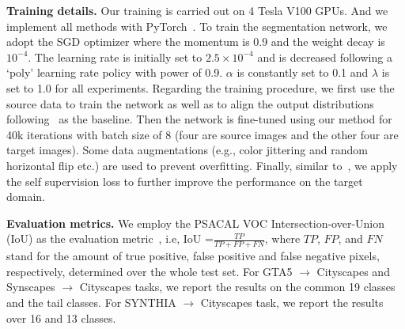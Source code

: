 \documentclass[runningheads]{llncs}
\begin{document}
\textbf{Training details.} Our training is carried out on 4 Tesla V100 GPUs. And we implement all methods with PyTorch~\cite{paszke2019pytorch}. To train the segmentation network, we adopt the SGD optimizer where the momentum is 0.9 and the weight decay is $10^{-4}$. The learning rate is initially set to $2.5\times 10^{-4}$ and is decreased following a `poly' learning rate policy with power of 0.9. $\alpha$ is constantly set to 0.1 and $\lambda$ is set to 1.0 for all experiments. 
Regarding the training procedure, we first use the source data to train the network as well as to align the output distributions following~\cite{tsai2018learning} as the baseline. Then the network is fine-tuned using our method for 40k iterations with batch size of 8 (four are source images and the other four are target images). Some data augmentations (e.g., color jittering and random horizontal flip etc.) are used to prevent overfitting. Finally, similar to~\cite{li2019bidirectional,pan2020unsupervised,wang2020class,wang2020differential}, we apply the self supervision loss to further improve the performance on the target domain. 

\textbf{Evaluation metrics.} We employ the PSACAL VOC Intersection-over-Union (IoU) as the evaluation metric~\cite{everingham2015IoU}, i.e, IoU =$\frac{TP}{TP+FP+FN}$, where $TP$, $FP$, and $FN$ stand for the amount of true positive, false positive and false negative pixels, respectively, determined over the whole test set. For GTA5 $\rightarrow$ Cityscapes and Synscapes $\rightarrow$ Cityscapes tasks, we report the results on the common 19 classes and the tail classes. For SYNTHIA $\rightarrow$ Cityscapes task, we report the results over 16 and 13 classes.
\end{document}
